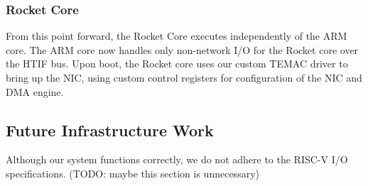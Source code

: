     \subsubsection{Rocket Core}

    From this point forward, the Rocket Core executes independently of the ARM 
    core. The ARM core now handles only non-network I/O for the Rocket core over
    the HTIF bus. Upon boot, the Rocket core uses our custom TEMAC driver to 
    bring up the NIC, using custom control registers for configuration of the
    NIC and DMA engine.


\subsection{Future Infrastructure Work}
    Although our system functions correctly, we do not adhere to the RISC-V
    I/O specifications. (TODO: maybe this section is unnecessary)
